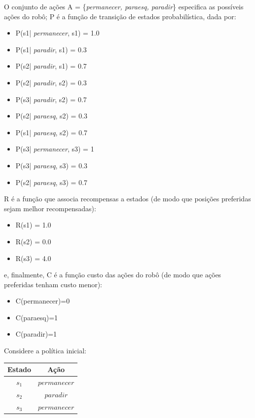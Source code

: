 \documentclass[a4paper,12pt]{article}
\begin{document}
O conjunto de ações A = \{\textit{permanecer, paraesq, paradir}\} especifica as possíveis ações do robô; P
é a função de transição de estados probabilística, dada por:
\begin{itemize}
	\item P(s1| \textit{permanecer}, s1) = 1.0
	\item P(s1| \textit{paradir}, s1) = 0.3
	\item P(s2| \textit{paradir}, s1) = 0.7
	\item P(s2| \textit{paradir}, s2) = 0.3
	\item P(s3| \textit{paradir}, s2) = 0.7
	\item P(s2| \textit{paraesq}, s2) = 0.3
	\item P(s1| \textit{paraesq}, s2) = 0.7
	\item P(s3| \textit{permanecer}, s3) = 1
	\item P(s3| \textit{paraesq}, s3) = 0.3
	\item P(s2| \textit{paraesq}, s3) = 0.7
\end{itemize}

R é a função que associa recompensas a estados (de modo que posições preferidas sejam
melhor recompensadas):

\begin{itemize}
	\item R(s1) = 1.0
	\item R(s2) = 0.0
	\item R(s3) = 4.0
\end{itemize}

e, finalmente, C é a função custo das ações do robô (de modo que ações preferidas tenham custo
menor):

\begin{itemize}
	\item C(permanecer)=0
	\item C(paraesq)=1
	\item C(paradir)=1
\end{itemize}

Considere a política inicial:

\begin{table}[h!]
	\centering
	\begin{tabular}{|c|c|}
		\hline
		\textbf{Estado} & \textbf{Ação} \\ \hline
		$s_1$ & $\textit{permanecer}$ \\ \hline
		$s_2$ & $\textit{paradir}$ \\ \hline
		$s_3$ & $\textit{permanecer}$ \\ \hline
	\end{tabular}
\end{table}
\end{document}
